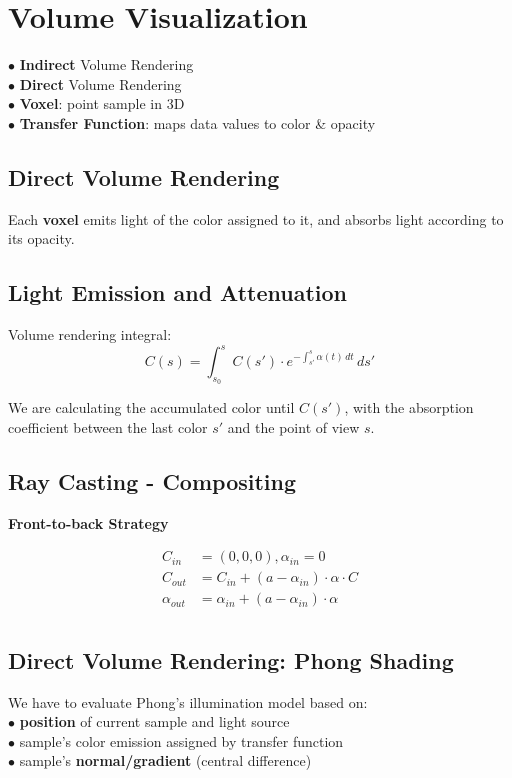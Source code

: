 
\section{Volume Visualization}
$\bullet$ \textbf{Indirect} Volume Rendering \\
$\bullet$ \textbf{Direct} Volume Rendering \\
$\bullet$ \textbf{Voxel}: point sample in 3D \\
$\bullet$ \textbf{Transfer Function}: maps data values to color \& opacity

\begin{center}
\end{center}

\subsection{Direct Volume Rendering}
Each \textbf{voxel} emits light of the color assigned to it, and absorbs light according to its opacity.

\subsection{Light Emission and Attenuation}
Volume rendering integral:
$$C(s) = \int_{s_0}^{s} C(s') \cdot e^{-\int_{s'}^s \alpha(t) \,dt} \,ds'$$

We are calculating the accumulated color until $C(s')$, with the absorption coefficient between the last color $s'$ and the point of view $s$.

\subsection{Ray Casting - Compositing}
\textbf{Front-to-back Strategy}

\begin{align*}
    C_{in} &= (0,0,0), \alpha_{in} = 0                         \\
    C_{out} &= C_{in} + (a - \alpha_{in}) \cdot \alpha \cdot C \\
    \alpha_{out} &= \alpha_{in} + (a - \alpha_{in}) \cdot \alpha    \\
\end{align*}

\subsection{Direct Volume Rendering: Phong Shading}
We have to evaluate Phong's illumination model based on: \\
$\bullet$ \textbf{position} of current sample and light source \\
$\bullet$ sample's \textnormal{color} emission assigned by transfer function \\
$\bullet$ sample's \textbf{normal/gradient} (central difference)

